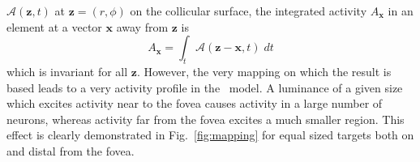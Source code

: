 \documentclass{frontiersSCNS}
\begin{document}
$\mathcal{A}(\mathbf{z},t)$ at $\mathbf{z} = (r,\phi)$ on the collicular
surface, the integrated activity  $A_{\mathbf{x}}$ in an element at a
vector $\mathbf{x}$ away from $\mathbf{z}$ is
\begin{equation}
A_{\mathbf{x}} = \int_t \mathcal{A}(\mathbf{z}-\mathbf{x}, t)\;dt
\end{equation}
which is invariant for all $\mathbf{z}$. However, the very mapping on
which the \cite{tabareau_geometry_2007} result is based leads to a
very  activity profile in the \ccg~model. A luminance of a
given size which excites activity near to the fovea causes activity in
a large number of neurons, whereas activity far from the fovea excites
a much smaller region. This effect is clearly demonstrated in
Fig.~\ref{fig:mapping} for equal sized targets both on and distal from
the fovea.
\end{document}
